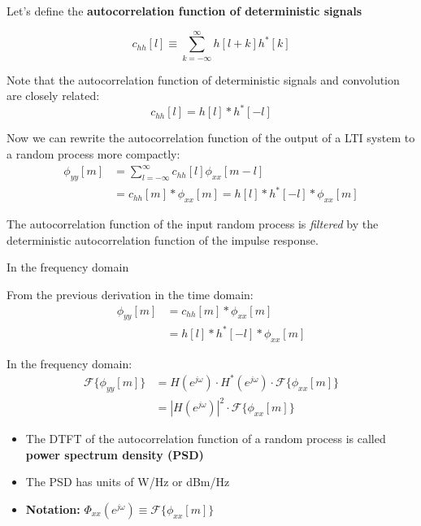 \documentclass[10pt]{beamer}
\begin{document}
\begin{frame}
Let's define the \textbf{autocorrelation function of deterministic signals}

\begin{equation*}
c_{hh}[l] \equiv \displaystyle\sum_{k=-\infty}^{\infty} h[l+k]h^*[k]
\end{equation*} 

\pause
Note that the autocorrelation function of deterministic signals and convolution are closely related:
\begin{equation*}
c_{hh}[l] = h[l]\ast h^*[-l]
\end{equation*} 

\pause
Now we can rewrite the autocorrelation function of the output of a LTI system to a random process more compactly:
\begin{align*}
\phi_{yy}[m] &= \sum_{l=-\infty}^{\infty} c_{hh}[l]\phi_{xx}[m-l] \\
&= c_{hh}[m]\ast \phi_{xx}[m] = h[l]\ast h^*[-l] \ast \phi_{xx}[m]
\end{align*} 

\pause
The autocorrelation function of the input random process is \textit{filtered} by the deterministic autocorrelation function of the impulse response.

\end{frame}

\begin{frame}{In the frequency domain}

From the previous derivation in the time domain:
\begin{align*}
\phi_{yy}[m] &= c_{hh}[m]\ast \phi_{xx}[m] \\
&= h[l]\ast h^*[-l]\ast \phi_{xx}[m]
\end{align*}

\pause
In the frequency domain:
\begin{align*}
\mathcal{F}\{\phi_{yy}[m]\} &= H(e^{j\omega})\cdot  H^*(e^{j\omega})\cdot \mathcal{F}\{\phi_{xx}[m]\} \\
&= |H(e^{j\omega})|^2\cdot\mathcal{F}\{\phi_{xx}[m]\}
\end{align*}

\begin{itemize}
	\pause\item The DTFT of the autocorrelation function of a random process is called \textbf{power spectrum density (PSD)}
	\pause\item The PSD has units of W/Hz or dBm/Hz
	\pause\item \textbf{Notation:} $\Phi_{xx}(e^{j\omega}) \equiv \mathcal{F}\{\phi_{xx}[m]\}$
\end{itemize}
\end{frame}
\end{document}
